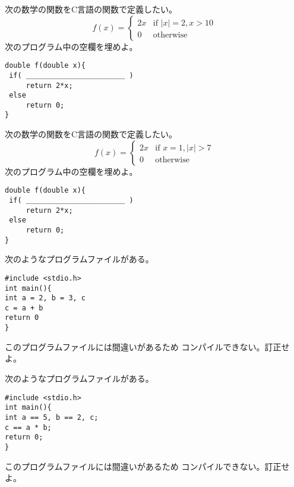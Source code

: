 \documentclass[12pt,a4j]{jarticle}
\newcounter{toi}
\def\toi{%
\bigskip\bigskip\noindent
\addtocounter{toi}{1}
\shadowbox{\bfseries\large 問\thetoi}
\nopagebreak[4]\bigskip\nopagebreak[4]
}
\begin{document}

\toi


次の数学の関数をC言語の関数で定義したい。
\[
f(x) = \left\{
\begin{array}{rl}
2x & \mbox{if $|x| = 2, x > 10$}\\
0  & \mbox{otherwise}
\end{array}\right.
\]
次のプログラム中の空欄を埋めよ。
\begin{verbatim}
double f(double x){
 if( ＿＿＿＿＿＿＿＿＿＿＿＿＿＿ )
     return 2*x;
 else
     return 0;
}
\end{verbatim}



\toi

次の数学の関数をC言語の関数で定義したい。
\[
f(x) = \left\{
\begin{array}{rl}
2x & \mbox{if $x=1, |x| > 7$}\\
0  & \mbox{otherwise}
\end{array}\right.
\]
次のプログラム中の空欄を埋めよ。
\begin{verbatim}
double f(double x){
 if( ＿＿＿＿＿＿＿＿＿＿＿＿＿＿ )
     return 2*x;
 else
     return 0;
}
\end{verbatim}





\toi


次のようなプログラムファイルがある。
\begin{verbatim}
#include <stdio.h>
int main(){
int a = 2, b = 3, c
c = a + b
return 0
}
\end{verbatim}
このプログラムファイルには間違いがあるため
コンパイルできない。訂正せよ。





\toi


次のようなプログラムファイルがある。
\begin{verbatim}
#include <stdio.h>
int main(){
int a == 5, b == 2, c;
c == a * b;
return 0;
}
\end{verbatim}
このプログラムファイルには間違いがあるため
コンパイルできない。訂正せよ。


\end{document}
